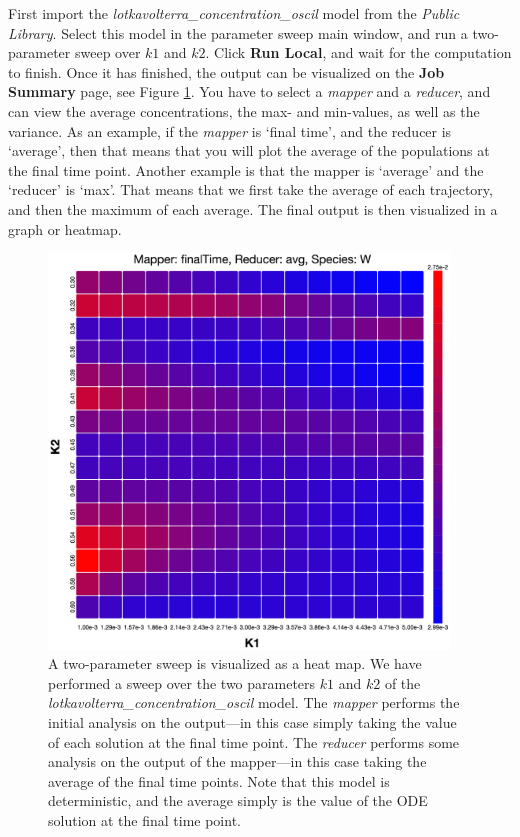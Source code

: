 First import the \emph{lotkavolterra\_concentration\_oscil} model from the \emph{Public Library}. Select this model in the parameter sweep main window, and run a two-parameter sweep over $k1$ and $k2$. Click \textbf{Run Local}, and wait for the computation to finish. Once it has finished, the output can be visualized on the \textbf{Job Summary} page, see Figure \ref{psweep-fig1}. You have to select a \emph{mapper} and a \emph{reducer}, and can view the average concentrations, the max- and min-values, as well as the variance. As an example, if the \emph{mapper} is `final time', and the reducer is `average', then that means that you will plot the average of the populations at the final time point. Another example is that the mapper is `average' and the `reducer' is `max'. That means that we first take the average of each trajectory, and then the maximum of each average. The final output is then visualized in a graph or heatmap.
\begin{figure}[!ht]
\centering
\includegraphics[width=0.95\textwidth]{Psweep/heatmap.png}
\caption{\label{psweep-fig1}A two-parameter sweep is visualized as a heat map. We have performed a sweep over the two parameters $k1$ and $k2$ of the \emph{lotkavolterra\_concentration\_oscil} model. The \emph{mapper} performs the initial analysis on the output---in this case simply taking the value of each solution at the final time point. The \emph{reducer} performs some analysis on the output of the mapper---in this case taking the average of the final time points. Note that this model is deterministic, and the average simply is the value of the ODE solution at the final time point.}
\end{figure}

